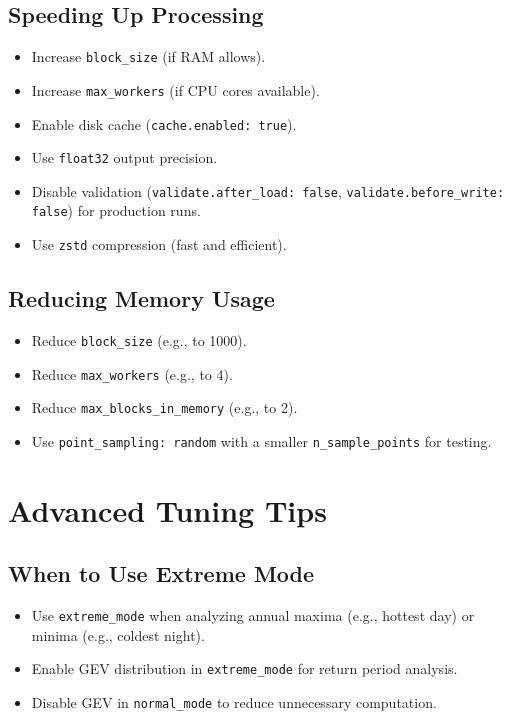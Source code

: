 \documentclass[12pt,a4paper]{article}
\begin{document}
\subsection{Speeding Up Processing}
\begin{itemize}
    \item Increase \texttt{block\_size} (if RAM allows).
    \item Increase \texttt{max\_workers} (if CPU cores available).
    \item Enable disk cache (\texttt{cache.enabled: true}).
    \item Use \texttt{float32} output precision.
    \item Disable validation (\texttt{validate.after\_load: false}, \texttt{validate.before\_write: false}) for production runs.
    \item Use \texttt{zstd} compression (fast and efficient).
\end{itemize}

\subsection{Reducing Memory Usage}
\begin{itemize}
    \item Reduce \texttt{block\_size} (e.g., to 1000).
    \item Reduce \texttt{max\_workers} (e.g., to 4).
    \item Reduce \texttt{max\_blocks\_in\_memory} (e.g., to 2).
    \item Use \texttt{point\_sampling: random} with a smaller \texttt{n\_sample\_points} for testing.
\end{itemize}

\section{Advanced Tuning Tips}

\subsection{When to Use Extreme Mode}
\begin{itemize}
    \item Use \texttt{extreme\_mode} when analyzing annual maxima (e.g., hottest day) or minima (e.g., coldest night).
    \item Enable GEV distribution in \texttt{extreme\_mode} for return period analysis.
    \item Disable GEV in \texttt{normal\_mode} to reduce unnecessary computation.
\end{itemize}
\end{document}

